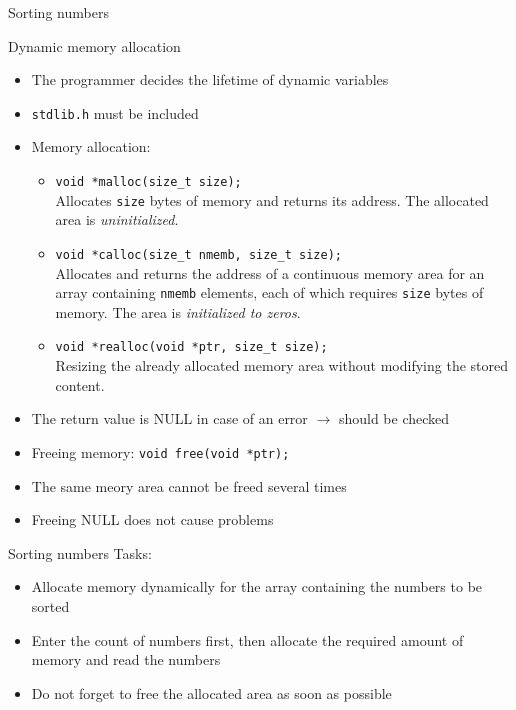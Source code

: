 \documentclass[usenames,dvipsnames,aspectratio=169]{beamer}
\begin{document}
\begin{frame}{Sorting numbers}
  \begin{exampleblock}{}
    
  \end{exampleblock}
\end{frame}

\begin{frame}{Dynamic memory allocation}
  \begin{itemize}
    \small
    \item The programmer decides the lifetime of dynamic variables
    \item \texttt{stdlib.h} must be included
    \item Memory allocation:\\
      \begin{itemize}
        \item \texttt{void *malloc(size\_t size);} \\
          Allocates \texttt{size} bytes of memory and returns its address. The allocated area is \emph{uninitialized}.
        \item \texttt{void *calloc(size\_t nmemb, size\_t size);} \\
          Allocates and returns the address of a continuous memory area for an array containing \texttt{nmemb} elements, each of which requires \texttt{size} bytes of memory. The area is \emph{initialized to zeros}.
        \item \texttt{void *realloc(void *ptr, size\_t size);} \\
          Resizing the already allocated memory area without modifying the stored content.
      \end{itemize}
    \item The return value is NULL in case of an error $\to$ should be checked
    \item Freeing memory: \texttt{void free(void *ptr);}
    \item The same meory area cannot be freed several times
    \item Freeing NULL does not cause problems
  \end{itemize}
\end{frame}

\begin{frame}{Sorting numbers}
  Tasks:
  \begin{itemize}
    \item Allocate memory dynamically for the array containing the numbers to be sorted
    \item Enter the count of numbers first, then allocate the required amount of memory and read the numbers
    \item Do not forget to free the allocated area as soon as possible
  \end{itemize}
\end{frame}
\end{document}
